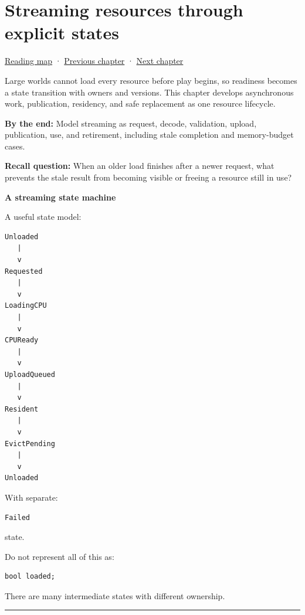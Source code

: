 \chapter{Streaming resources through explicit states}\label{05-engine-i-ch011-streaming-resources-through-explicit-states}\hypertarget{05-engine-i-ch011}{}\label{stagechapter:05-engine-i-ch011}

\hypertarget{05-engine-i-ch011-streaming-resources-through-explicit-states}{}

\hyperref[volume-reading-map]{Reading map} · \hyperref[05-engine-i-ch010-engine-changes-across-subsystem-contracts]{Previous chapter} · \hyperref[05-engine-i-ch012-transactions-recovery-and-safe-project-boundaries]{Next chapter}

Large worlds cannot load every resource before play begins, so readiness becomes a state transition with owners and versions. This chapter develops asynchronous work, publication, residency, and safe replacement as one resource lifecycle.

\textbf{By the end:} Model streaming as request, decode, validation, upload, publication, use, and retirement, including stale completion and memory-budget cases.

\textbf{Recall question:} When an older load finishes after a newer request, what prevents the stale result from becoming visible or freeing a resource still in use?

\textbf{A streaming state machine}

A useful state model:

\begin{verbatim}
Unloaded
   |
   v
Requested
   |
   v
LoadingCPU
   |
   v
CPUReady
   |
   v
UploadQueued
   |
   v
Resident
   |
   v
EvictPending
   |
   v
Unloaded
\end{verbatim}

With separate:

\begin{verbatim}
Failed
\end{verbatim}

state.

Do not represent all of this as:

\begin{verbatim}
bool loaded;
\end{verbatim}

There are many intermediate states with different ownership.

\begin{center}\rule{0.5\linewidth}{0.5pt}\end{center}

